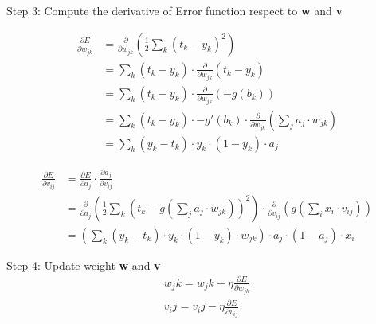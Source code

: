 \documentclass[UTF-8]{article}
\begin{document}
Step 3: Compute the derivative of Error function
respect to \textbf{w} and \textbf{v}

\begin{equation}
  \begin{split}
    \frac{\partial E}{\partial w_{jk}}
    &=\frac{\partial}{\partial w_{jk}} (\frac{1}{2} \sum_k (t_k-y_k)^2)\\
    &=\sum_k (t_k-y_k)\cdot \frac{\partial}{\partial w_{jk}} (t_k-y_k)\\
    &=\sum_k (t_k-y_k)\cdot \frac{\partial}{\partial w_{jk}} (-g(b_k))\\
    &=\sum_k (t_k-y_k)\cdot -g'(b_k)\cdot \frac{\partial}{\partial w_{jk}} (\sum_j a_j\cdot w_{jk})\\
    &=\sum_k (y_k-t_k)\cdot y_k\cdot(1-y_k)\cdot a_j
  \end{split}
\end{equation}

\begin{equation}
  \begin{split}
    \frac{\partial E}{\partial v_{ij}}
    &=\frac{\partial E}{\partial a_j}\cdot \frac{\partial a_j}{\partial v_{ij}}\\
    &=\frac{\partial}{\partial a_j} (\frac{1}{2} \sum_k (t_k-g(\sum_j a_j\cdot w_{jk}))^2) \cdot \frac{\partial}{\partial v_{ij}} (g(\sum_i x_i\cdot v_{ij}))\\
    &=(\sum_k (y_k-t_k)\cdot y_k \cdot (1-y_k)\cdot w_{jk}) \cdot a_j\cdot (1-a_j)\cdot x_i
  \end{split}
\end{equation}

Step 4: Update weight \textbf{w} and \textbf{v}
\begin{gather}
  w_jk = w_jk - \eta \frac{\partial E}{\partial w_{jk}}\\
  v_ij = v_ij - \eta \frac{\partial E}{\partial v_{ij}}
\end{gather}
\end{document}
